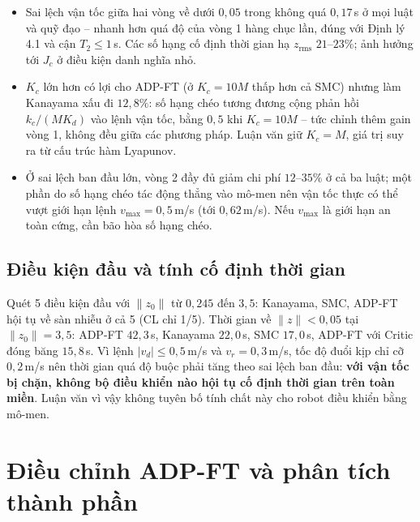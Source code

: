 \documentclass[12pt,a4paper]{article}
\begin{document}
\begin{itemize}
    \item Sai lệch vận tốc giữa hai vòng về dưới $0{,}05$ trong không quá $0{,}17$\,s ở mọi luật và quỹ đạo -- nhanh hơn quá độ của vòng 1 hàng chục lần, đúng với Định lý 4.1 và cận $T_2 \leq 1$\,s. Các số hạng cố định thời gian hạ $z_\text{rms}$ $21$--$23\%$; ảnh hưởng tới $J_c$ ở điều kiện danh nghĩa nhỏ.
    \item $K_c$ lớn hơn có lợi cho ADP-FT (ở $K_c = 10M$ thấp hơn cả SMC) nhưng làm Kanayama xấu đi $12{,}8\%$: số hạng chéo tương đương cộng phản hồi $k_c/(MK_d)$ vào lệnh vận tốc, bằng $0{,}5$ khi $K_c = 10M$ -- tức chỉnh thêm gain vòng 1, không đều giữa các phương pháp. Luận văn giữ $K_c = M$, giá trị suy ra từ cấu trúc hàm Lyapunov.
    \item Ở sai lệch ban đầu lớn, vòng 2 đầy đủ giảm chi phí $12$--$35\%$ ở cả ba luật; một phần do số hạng chéo tác động thẳng vào mô-men nên vận tốc thực có thể vượt giới hạn lệnh $v_{\max} = 0{,}5$\,m/s (tới $0{,}62$\,m/s). Nếu $v_{\max}$ là giới hạn an toàn cứng, cần bão hòa số hạng chéo.
\end{itemize}

\subsection{Điều kiện đầu và tính cố định thời gian}

Quét 5 điều kiện đầu với $\|z_0\|$ từ $0{,}245$ đến $3{,}5$: Kanayama, SMC, ADP-FT hội tụ về sàn nhiễu ở cả 5 (CL chỉ 1/5). Thời gian về $\|z\| < 0{,}05$ tại $\|z_0\| = 3{,}5$: ADP-FT $42{,}3$\,s, Kanayama $22{,}0$\,s, SMC $17{,}0$\,s, ADP-FT với Critic đóng băng $15{,}8$\,s. Vì lệnh $|v_d| \leq 0{,}5$\,m/s và $v_r = 0{,}3$\,m/s, tốc độ đuổi kịp chỉ cỡ $0{,}2$\,m/s nên thời gian quá độ buộc phải tăng theo sai lệch ban đầu: \textbf{với vận tốc bị chặn, không bộ điều khiển nào hội tụ cố định thời gian trên toàn miền}. Luận văn vì vậy không tuyên bố tính chất này cho robot điều khiển bằng mô-men.

\section{Điều chỉnh ADP-FT và phân tích thành phần}
\label{sec:tuning}
\end{document}
